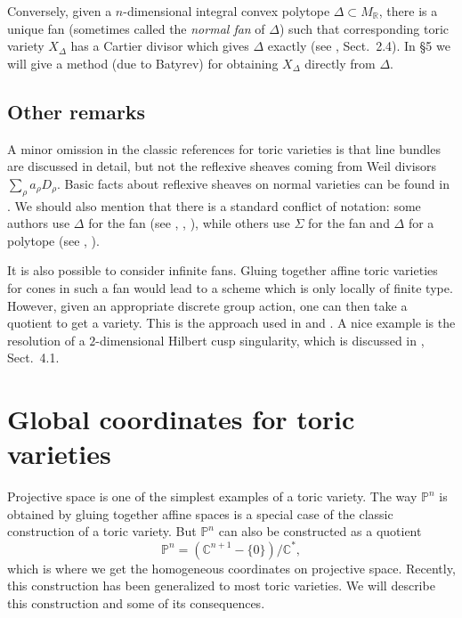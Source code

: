\documentclass{amsart}
\theoremstyle{plain}
\theoremstyle{definition}
\begin{document}
	Conversely, given a $n$-dimensional integral convex polytope
$\Delta \subset M_{\mathbb{R}}$, there is a unique fan (sometimes called
the {\it normal fan\/} of $\Delta$) such that corresponding toric
variety $X_\Delta$ has a Cartier divisor which gives $\Delta$ exactly
(see \cite{Oda1}, Sect.~2.4).  In \S5 we will give a method (due
to Batyrev) for obtaining $X_\Delta$ directly from $\Delta$.

	\subsection{Other remarks} A minor omission in the
classic references for toric varieties is that line bundles are
discussed in detail, but not the reflexive sheaves coming from Weil
divisors $\sum_\rho a_\rho D_\rho$.  Basic facts about reflexive
sheaves on normal varieties can be found in \cite{Rei1}.  We should
also mention that there is a standard conflict of notation: some
authors use $\Delta$ for the fan (see \cite{Ful},
\cite{Oda2}, \cite{Stu2}), while others use $\Sigma$ for the fan and
$\Delta$ for a polytope (see \cite{Dan2}, \cite{Bat1}).

	It is also possible to consider infinite fans.  Gluing
together affine toric varieties for cones in such a fan would lead to
a scheme which is only locally of finite type.  However, given an
appropriate discrete group action, one can then take a quotient to get
a variety.  This is the approach used in \cite{KKMS} and \cite{AMRT}.
A nice example is the resolution of a $2$-dimensional Hilbert cusp
singularity, which is discussed in \cite{Oda1}, Sect.~4.1.

\section{Global coordinates for toric varieties}

	Projective space is one of the simplest examples of a toric
variety.  The way $\mathbb{P}^n$ is obtained by gluing together affine
spaces is a special case of the classic construction of a toric
variety.  But $\mathbb{P}^n$ can also be constructed as a quotient
\[
\mathbb{P}^n = (\mathbb{C}^{n+1} - \{0\}) / \mathbb{C}^*,
\]
which is where we get the homogeneous coordinates on projective
space.  Recently, this construction has been generalized to most toric
varieties.  We will describe this construction and some of its
consequences. 
\end{document}
